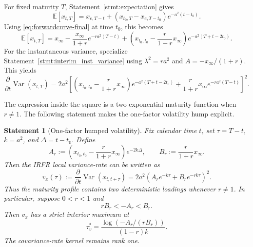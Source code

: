\documentclass[12pt]{article}
\theoremstyle{statementstyle}
\newtheorem{statement}{Statement}[section]
\begin{document}
For fixed maturity \(T\), Statement~\ref{stmt:expectation} gives
\[
\mathbb{E}[x_{t,T}]
=
x_{e,T-t}
+
\left(x_{t_{0},T}-x_{e,T-t_{0}}\right)e^{-a^{2}(t-t_{0})}.
\]
Using \eqref{eq:forwardcurve-final} at time \(t_{0}\), this becomes
\begin{equation}
\mathbb{E}[x_{t,T}]
=
x_{\infty}
-
\frac{x_{\infty}}{1+r}e^{-ra^{2}(T-t)}
+
\left(
x_{t_{0},t_{0}}
-
\frac{r}{1+r}x_{\infty}
\right)e^{-a^{2}(T+t-2t_{0})}.
\tag{5.6.1}\label{eq:mean-final}
\end{equation}
For the instantaneous variance, specialize
Statement~\ref{stmt:interim_inst_variance} using
\(\lambda^{2}=ra^{2}\) and \(A=-x_{\infty}/(1+r)\). This yields
\begin{equation}
\frac{\partial}{\partial t}\operatorname{Var}(x_{t,T})
=
2a^{2}
\left[
\left(
x_{t_{0},t_{0}}
-
\frac{r}{1+r}x_{\infty}
\right)e^{-a^{2}(T+t-2t_{0})}
+
\frac{r}{1+r}x_{\infty}e^{-ra^{2}(T-t)}
\right]^{2}.
\tag{5.6.2}\label{eq:var-final}
\end{equation}

The expression inside the square is a two-exponential maturity function
when \(r\neq 1\). The following statement makes the one-factor volatility
hump explicit.

\begin{statement}[One-factor humped volatility]
\label{stmt:one-factor-humped-volatility}
Fix calendar time \(t\), set \(\tau=T-t\), \(k=a^{2}\), and
\(\Delta=t-t_{0}\). Define
\[
A_{r}:=
\left(
x_{t_{0},t_{0}}-\frac{r}{1+r}x_{\infty}
\right)e^{-2k\Delta},
\qquad
B_{r}:=\frac{r}{1+r}x_{\infty}.
\]
Then the IRFR local variance-rate can be written as
\begin{equation}
 v_{x}(\tau)
 :=
 \frac{\partial}{\partial t}\operatorname{Var}(x_{t,t+\tau})
 =
 2a^{2}\left(A_{r}e^{-k\tau}+B_{r}e^{-rk\tau}\right)^{2}.
\tag{5.6.3}\label{eq:one-factor-hump-profile}
\end{equation}
Thus the maturity profile contains two deterministic loadings whenever
\(r\neq 1\). In particular, suppose \(0<r<1\) and
\[
rB_{r}<-A_{r}<B_{r}.
\]
Then \(v_{x}\) has a strict interior maximum at
\begin{equation}
\tau_{v}^{\ast}
=
\frac{\log\left(-A_{r}/(rB_{r})\right)}{(1-r)k}.
\tag{5.6.4}\label{eq:vol-hump-location}
\end{equation}
The covariance-rate kernel remains rank one.
\end{statement}
\end{document}
